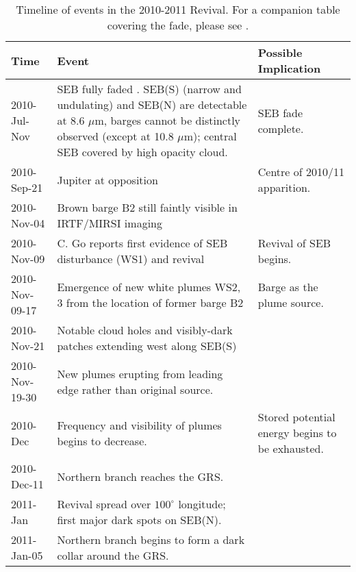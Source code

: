 \documentclass[final,authoryear,5p,times,twocolumn]{elsarticle}
\begin{document}
\begin{table*}[htdp]
\caption{Timeline of events in the 2010-2011 Revival.  For a companion table covering the fade, please see \citet{11fletcher_fade}.}
\begin{center}
\begin{tabular}{|l|p{10cm}|p{5cm}|}
\hline
\textbf{Time} & \textbf{Event} & \textbf{Possible Implication}  \\
\hline

2010-Jul-Nov & SEB fully faded \citep{11fletcher_fade}.  SEB(S) (narrow and undulating) and SEB(N) are detectable at 8.6 $\mu$m, barges cannot be distinctly observed (except at 10.8 $\mu$m); central SEB covered by high opacity cloud. & SEB fade complete.\\

2010-Sep-21 & Jupiter at opposition & Centre of 2010/11 apparition. \\

2010-Nov-04 & Brown barge B2 still faintly visible in IRTF/MIRSI imaging & \\

2010-Nov-09 & C. Go reports first evidence of SEB disturbance (WS1) and revival & Revival of SEB begins. \\

2010-Nov-09-17 & Emergence of new white plumes WS2, 3 from the location of former barge B2 & Barge as the plume source. \\

2010-Nov-21 & Notable cloud holes and visibly-dark patches extending west along SEB(S) & \\

2010-Nov-19-30 & New plumes erupting from leading edge rather than original source. & \\

2010-Dec & Frequency and visibility of plumes begins to decrease. & Stored potential energy begins to be exhausted.\\

2010-Dec-11 & Northern branch reaches the GRS.  & \\

2011-Jan & Revival spread over $100^\circ$ longitude; first major dark spots on SEB(N). &  \\

2011-Jan-05 & Northern branch begins to form a dark collar around the GRS. & \\


\end{tabular}
\end{center}
\end{table*}
\end{document}
